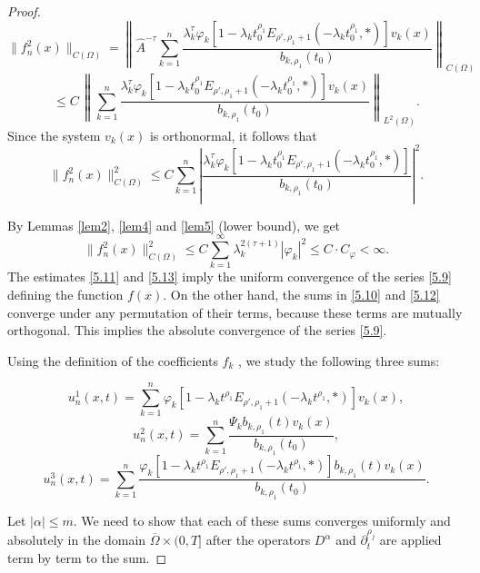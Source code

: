 \documentclass[12pt, reqno]{amsart}
\theoremstyle{definition}
\theoremstyle{remark}
\numberwithin{equation}{section}
\begin{document}
\begin{proof}
 $$
\| f_n^2(x) \|_{C(\Omega)}
=
\left\|
 \widehat{A}^{-\tau} \sum_{k=1}^{n}\frac{\lambda_k^\tau\varphi_k \left[ 1 - \lambda_k t_0^{\rho_1} E_{\rho', \rho_1 + 1} \left( -\lambda_k t_0^{\rho_1}, * \right) \right]v_k(x)}{b_{k,\rho_1}(t_0)}
\right\|_{C(\Omega)}$$
\begin{equation}\label{5.12}
\le C \,
\left\|
\sum_{k=1}^{n}\frac{\lambda_k^\tau\varphi_k \left[ 1 - \lambda_k t_0^{\rho_1} E_{ \rho', \rho_1 + 1} \left( -\lambda_k t_0^{\rho_1}, * \right) \right]v_k(x)}{b_{k,\rho_1}(t_0)}
\right\|_{L^2(\Omega)}.\end{equation}
Since the system ${v_k(x)}$ is orthonormal, it follows that
$$
\| f_n^2(x) \|_{C(\Omega)}^2
\le
C 
\sum_{k=1}^{n}\left|\frac{\lambda_k^\tau\varphi_k \left[ 1 - \lambda_k t_0^{\rho_1} E_{ \rho', \rho_1 + 1} \left( -\lambda_k t_0^{\rho_1}, * \right) \right]}{b_{k,\rho_1}(t_0)}
\right|^2.
$$

By Lemmas \ref{lem2}, \ref{lem4} and \ref{lem5} (lower bound), we get
\begin{equation}\label{5.13}
\| f_n^2(x) \|_{C(\Omega)}^2
 \le
C\sum_{k=1}^{\infty} \lambda_k^{2(\tau+1)} |\varphi_k|^2 \le C\cdot C_{\varphi} < \infty.
\end{equation}
The estimates \eqref{5.11} and \eqref{5.13} imply the uniform convergence of the series \eqref{5.9} defining the function $f(x)$. On the other hand, the sums in \eqref{5.10} and \eqref{5.12} converge under any permutation of their
terms, because these terms are mutually orthogonal. This implies the absolute convergence of the
series \eqref{5.9}.

Using the definition of the coefficients $f_k$ , we study the following three sums:

\begin{equation}\label{5.14}
u_n^1(x,t)=\sum_{k=1}^{n}\varphi_k \left[ 1 - \lambda_k t^{\rho_1} E_{ \rho', \rho_1 + 1} \left( -\lambda_k t^{\rho_1}, * \right) \right]v_k(x),
\end{equation}
\begin{equation}\label{5.15}
u_n^2(x,t)=\sum_{k=1}^{n} \frac{\Psi_kb_{k,\rho_1}(t) v_k(x)}{b_{k,\rho_1}(t_0)},
\end{equation}
\begin{equation}\label{5.16}
u_n^3(x,t)=\sum_{k=1}^n \frac{\varphi_k \left[ 1 - \lambda_k t^{\rho_1} E_{ \rho', \rho_1 + 1} \left( -\lambda_k t^{\rho_1}, * \right) \right]b_{k,\rho_1}(t)v_k(x)}{b_{k,\rho_1}(t_0)}.
\end{equation}

 Let $|\alpha|\le m$. We need to show that each of these sums converges uniformly
and absolutely in the domain $\overline{\Omega} \times (0 , T]$ after the operators $D^\alpha$ and
$\partial_t^{\rho_j}$ are applied term by term to the sum.


\end{proof}
\end{document}
